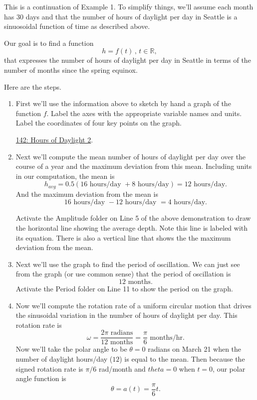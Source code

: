 \documentclass{ximera}
\begin{document}
\begin{example}  \label{EDFredsfRRER}
This is a continuation of Example 1. To simplify things, we'll assume each month has $30$ days and that the number of hours of daylight per day in Seattle is a sinuosoidal function of time as described above.

Our goal is to find a function 
\[
  h = f(t) \, , \, t\in \mathbb{R},
\] 
that expresses the number of hours of daylight per day in Seattle in terms of the number of months since the spring equinox.


Here are the steps.

\begin{enumerate}

\item  First we'll use the information above to sketch by hand a graph of the function $f$. Label the axes with the appropriate variable names and units. Label the coordinates of four key points on the graph.

\href{https://www.desmos.com/calculator/gw4xkdcvhi}{142: Hours of Daylight 2}.

 
\begin{onlineOnly}
    \begin{center}
\end{center}
\end{onlineOnly}

\item Next we'll compute the mean number of hours of daylight per day over the course of a year and the maximum deviation from this mean. Including units in our computation, the mean is 
\[
    h_{avg} = 0.5 ( 16 \text{ hours/day } + 8 \text{ hours/day}) = 12 \text{ hours/day} . 
\]
And the maximum deviation from the mean is
\[
     16 \text{ hours/day } - 12 \text{ hours/day } = 4 \text{ hours/day}.
\]

Activate the Amplitude folder on Line 5 of the above demonstration to draw the horizontal line showing the average depth. Note this line is labeled with its equation. There is also a vertical line that shows the the maximum deviation from the mean.

\item Next we'll use the graph to find the period of oscillation. We can just see from the graph (or use common sense) that the period of oscillation is
\[
     12 \text{ months}.
\]
Activate the Period folder on Line 11 to show the period on the graph.

\item Now we'll compute the rotation rate of a uniform circular motion that drives the sinusoidal variation in the number of hours of daylight per day. This rotation rate is
\[
  \omega = \frac{2\pi \text{ radians}}{12 \text{ months}} = \frac{\pi}{6} \text{ months/hr} .
\]
Now we'll take the polar angle to be $\theta=0$ radians on March 21 when the number of daylight hours/day ($12$) is equal to the mean.  Then because the signed rotation rate is $\pi/6$ rad/month and $theta = 0$ when $t=0$, our polar angle function is
\[
   \theta = a(t) = \frac{\pi}{6}t.
\]


\end{enumerate}
\end{example}
\end{document}
